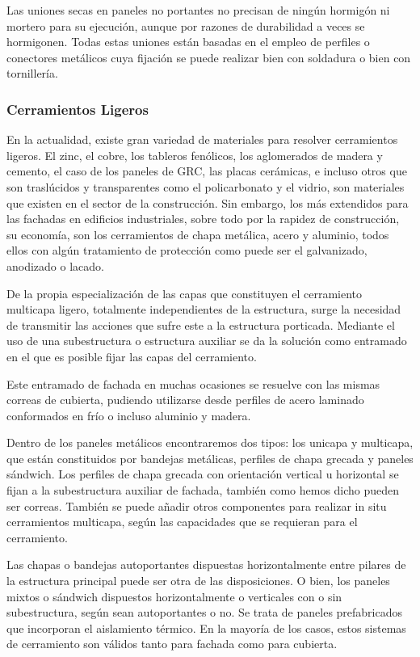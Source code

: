 Las uniones secas en paneles no portantes no precisan de ningún hormigón ni mortero para su ejecución, aunque por razones de durabilidad a veces se hormigonen. Todas estas uniones están basadas en el empleo de perfiles o conectores metálicos cuya fijación se puede realizar bien con soldadura o bien con tornillería.

\subsubsection*{Cerramientos Ligeros}

En la actualidad, existe gran variedad de materiales para resolver cerramientos ligeros. El zinc, el cobre, los tableros fenólicos, los aglomerados de madera y cemento, el caso de los paneles de GRC, las placas cerámicas, e incluso otros que son traslúcidos y transparentes como el policarbonato y el vidrio, son materiales que existen en el sector de la construcción. Sin embargo, los más extendidos para las fachadas en edificios industriales, sobre todo por la rapidez de construcción, su economía, son los cerramientos de chapa metálica, acero y aluminio, todos ellos con algún tratamiento de protección como puede ser el galvanizado, anodizado o lacado.

De la propia especialización de las capas que constituyen el cerramiento multicapa ligero, totalmente independientes de la estructura, surge la necesidad de transmitir las acciones que sufre este a la estructura porticada. Mediante el uso de una subestructura o estructura auxiliar se da la solución como entramado en el que es posible fijar las capas del cerramiento.

Este entramado de fachada en muchas ocasiones se resuelve con las mismas correas de cubierta, pudiendo utilizarse desde perfiles de acero laminado conformados en frío o incluso aluminio y madera.

Dentro de los paneles metálicos encontraremos dos tipos: los unicapa y multicapa, que están constituidos por bandejas metálicas, perfiles de chapa grecada y paneles sándwich. Los perfiles de chapa grecada con orientación vertical u horizontal se fijan a la subestructura auxiliar de fachada, también como hemos dicho pueden ser correas. También se puede añadir otros componentes para realizar in situ cerramientos multicapa, según las capacidades que se requieran para el cerramiento.

Las chapas o bandejas autoportantes dispuestas horizontalmente entre pilares de la estructura principal puede ser otra de las disposiciones. O bien, los paneles mixtos o sándwich dispuestos horizontalmente o verticales con o sin subestructura, según sean autoportantes o no. Se trata de paneles prefabricados que incorporan el aislamiento térmico. En la mayoría de los casos, estos sistemas de cerramiento son válidos tanto para fachada como para cubierta.

